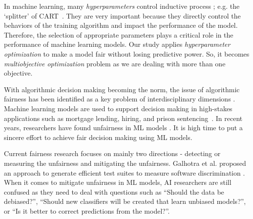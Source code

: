  In machine learning, many  {\em hyperparameters} control   inductive process ; e.g. the   `splitter' of CART~\cite{breiman2017classification}.  They are very important because they directly control the behaviors of the training algorithm and impact the performance of the model. Therefore, the selection of appropriate parameters plays a critical role in the performance of machine learning models. Our study applies \textit{hyperparameter optimization} to make a model fair without losing predictive power. So, it becomes \textit{multiobjective optimization} problem as we are dealing with more than one objective. 
 

 
With algorithmic decision making becoming the norm, the issue of algorithmic fairness has been identified as a key problem of interdisciplinary dimensions \cite{IBM} . Machine learning models are used to support decision making in high-stakes applications such as mortgage lending, hiring, and prison sentencing~\cite{ladd1998evidence,burrell2016machine,corbett2018measure,galindo2000credit,yan2013system,chalfin2016productivity,ajit2016prediction,berk2015machine,berk2016forecasting,ozkan2017predicting}. In recent years, researchers have found unfairness in ML models \cite{IBM}. It is high time to put a sincere effort to achieve fair decision making using ML models.

Current fairness research focuses on mainly two directions - detecting or measuring  the unfairness and mitigating the unfairness. Galhotra et al. proposed an approach to generate efficient test suites to measure software discrimination \cite{Galhotra_2017}. When it comes to mitigate unfairness in ML models, AI researchers are still confused as they need to deal with questions such as ``Should the data be debiased?'', ``Should new classifiers will be created that learn unbiased models?'', or ``Is it better to correct predictions from the model?''. 

    
